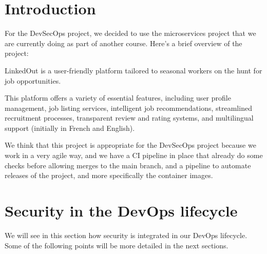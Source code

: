 \documentclass[12pt,x11names]{article}
\begin{document}
\tableofcontents
\listoffigures

\newpage

\section{Introduction}

For the DevSecOps project, we decided to use the microservices project that we are
currently doing as part of another course. Here's a brief overview of the project:

\medskip
LinkedOut is a user-friendly platform tailored to seasonal workers on the hunt for 
job opportunities.

\medskip
This platform offers a variety of essential features, including user profile management, 
job listing services, intelligent job recommendations, streamlined recruitment processes, 
transparent review and rating systems, and multilingual support (initially in French 
and English).

\medskip
We think that this project is appropriate for the DevSecOps project because 
we work in a very agile way, and we have a CI pipeline in place that already do 
some checks before allowing merges to the main branch, and a pipeline to 
automate releases of the project, and more specifically the container images.

\section{Security in the DevOps lifecycle}

We will see in this section how security is integrated in our DevOps lifecycle. Some
of the following points will be more detailed in the next sections.
\end{document}
